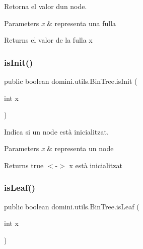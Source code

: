 Retorna el valor d\textquotesingle{}un node. 


\begin{DoxyParams}{Parameters}
{\em x} & representa una fulla \\
\hline
\end{DoxyParams}
\begin{DoxyReturn}{Returns}
el valor de la fulla x 
\end{DoxyReturn}
\mbox{\label{classdomini_1_1utils_1_1BinTree_aefcc4df5059f9893eba9998cb267eced}} 
\subsubsection{\texorpdfstring{is\+Init()}{isInit()}}
{\footnotesize\ttfamily public boolean domini.\+utils.\+Bin\+Tree.\+is\+Init (\begin{DoxyParamCaption}\item[{int}]{x }\end{DoxyParamCaption})\hspace{0.3cm}{\ttfamily [inline]}}



Indica si un node està inicialitzat. 


\begin{DoxyParams}{Parameters}
{\em x} & representa un node \\
\hline
\end{DoxyParams}
\begin{DoxyReturn}{Returns}
true $<$-\/$>$ x està inicialitzat 
\end{DoxyReturn}
\mbox{\label{classdomini_1_1utils_1_1BinTree_a37030e961f5613a5c74984ac002d965b}} 
\subsubsection{\texorpdfstring{is\+Leaf()}{isLeaf()}}
{\footnotesize\ttfamily public boolean domini.\+utils.\+Bin\+Tree.\+is\+Leaf (\begin{DoxyParamCaption}\item[{int}]{x }\end{DoxyParamCaption})\hspace{0.3cm}{\ttfamily [inline]}}



